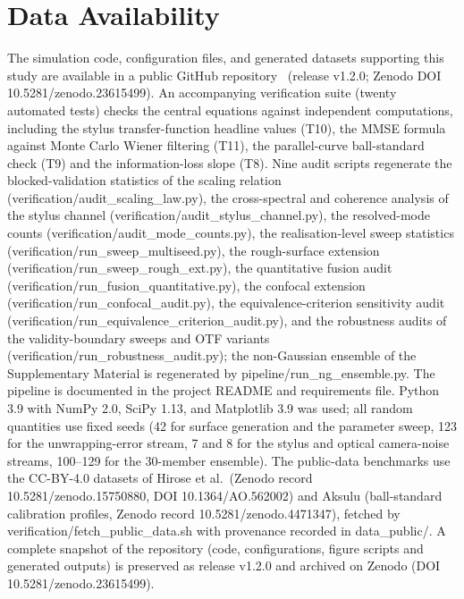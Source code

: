 \documentclass[review,12pt]{elsarticle}
\begin{document}
\section*{Data Availability}
The simulation code, configuration files, and generated datasets supporting this study are available in a public GitHub repository~\cite{kucharski2026repository} (release v1.2.0; Zenodo DOI 10.5281/zenodo.23615499). An accompanying verification suite (twenty automated tests) checks the central equations against independent computations, including the stylus transfer-function headline values (T10), the MMSE formula against Monte Carlo Wiener filtering (T11), the parallel-curve ball-standard check (T9) and the information-loss slope (T8). Nine audit scripts regenerate the blocked-validation statistics of the scaling relation (verification/audit\_scaling\_law.py), the cross-spectral and coherence analysis of the stylus channel (verification/audit\_stylus\_channel.py), the resolved-mode counts (verification/audit\_mode\_counts.py), the realisation-level sweep statistics (verification/run\_sweep\_multiseed.py), the rough-surface extension (verification/run\_sweep\_rough\_ext.py), the quantitative fusion audit (verification/run\_fusion\_quantitative.py), the confocal extension (verification/run\_confocal\_audit.py), the equivalence-criterion sensitivity audit (verification/run\_equivalence\_criterion\_audit.py), and the robustness audits of the validity-boundary sweeps and OTF variants (verification/run\_robustness\_audit.py); the non-Gaussian ensemble of the Supplementary Material is regenerated by pipeline/run\_ng\_ensemble.py. The pipeline is documented in the project README and requirements file. Python 3.9 with NumPy 2.0, SciPy 1.13, and Matplotlib 3.9 was used; all random quantities use fixed seeds (42 for surface generation and the parameter sweep, 123 for the unwrapping-error stream, 7 and 8 for the stylus and optical camera-noise streams, 100--129 for the 30-member ensemble). The public-data benchmarks use the CC-BY-4.0 datasets of Hirose et al.\ (Zenodo record 10.5281/zenodo.15750880, DOI 10.1364/AO.562002) and Aksulu (ball-standard calibration profiles, Zenodo record 10.5281/zenodo.4471347), fetched by verification/fetch\_public\_data.sh with provenance recorded in data\_public/. A complete snapshot of the repository (code, configurations, figure scripts and generated outputs) is preserved as release v1.2.0 and archived on Zenodo (DOI 10.5281/zenodo.23615499).



\end{document}
